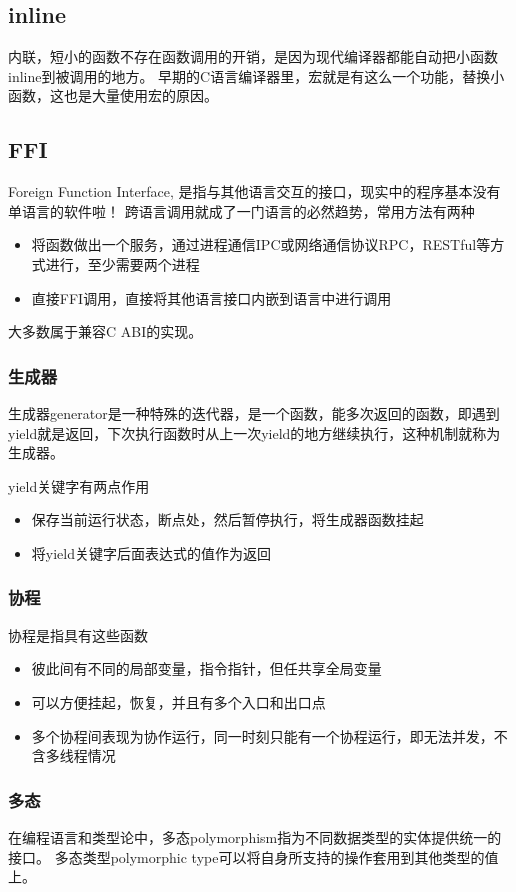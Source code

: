 \subsection{inline}
内联，短小的函数不存在函数调用的开销，是因为现代编译器都能自动把小函数inline到被调用的地方。
早期的C语言编译器里，宏就是有这么一个功能，替换小函数，这也是大量使用宏的原因。

\subsection{FFI}
Foreign Function Interface, 是指与其他语言交互的接口，现实中的程序基本没有单语言的软件啦！
跨语言调用就成了一门语言的必然趋势，常用方法有两种
\begin{itemize}
    \item {将函数做出一个服务，通过进程通信IPC或网络通信协议RPC，RESTful等方式进行，至少需要两个进程}
    \item {直接FFI调用，直接将其他语言接口内嵌到语言中进行调用}
\end{itemize}
大多数属于兼容C ABI的实现。

\subsubsection{生成器}
生成器generator是一种特殊的迭代器，是一个函数，能多次返回的函数，即遇到yield就是返回，下次执行函数时从上一次yield的地方继续执行，这种机制就称为生成器。

yield关键字有两点作用
\begin{itemize}
    \item {保存当前运行状态，断点处，然后暂停执行，将生成器函数挂起}
    \item {将yield关键字后面表达式的值作为返回}
\end{itemize}

\subsubsection{协程}
协程是指具有这些函数
\begin{itemize}
    \item {彼此间有不同的局部变量，指令指针，但任共享全局变量}
    \item {可以方便挂起，恢复，并且有多个入口和出口点}
    \item {多个协程间表现为协作运行，同一时刻只能有一个协程运行，即无法并发，不含多线程情况}
\end{itemize}

\subsubsection{多态}
在编程语言和类型论中，多态polymorphism指为不同数据类型的实体提供统一的接口。
多态类型polymorphic type可以将自身所支持的操作套用到其他类型的值上。

